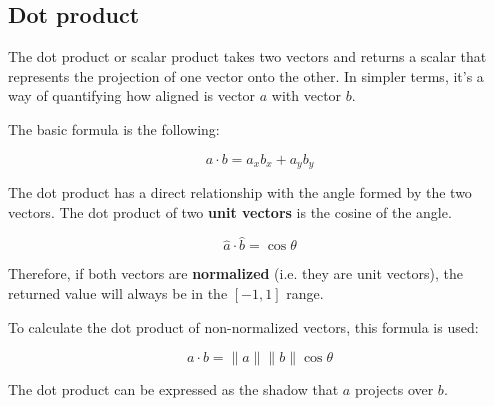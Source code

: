 \documentclass{amsart}
\begin{document}
\subsection{Dot product}

The dot product or scalar product takes two vectors and returns a scalar that
represents the projection of one vector onto the other. In simpler terms, it's a
way of quantifying how aligned is vector $a$ with vector $b$.

The basic formula is the following:

\begin{displaymath}
  a \cdot b = a_x b_x + a_y b_y
\end{displaymath}

The dot product has a direct relationship with the angle formed by the two
vectors. The dot product of two \textbf{unit vectors} is the cosine of the
angle.

\begin{displaymath}
  \hat{a} \cdot \hat{b} = \cos \theta
\end{displaymath}

Therefore, if both vectors are \textbf{normalized} (i.e. they are unit vectors),
the returned value will always be in the $[-1,1]$ range.

To calculate the dot product of non-normalized vectors, this formula is used:

\begin{displaymath}
  a \cdot b = \|a\| \|b\| \cos \theta
\end{displaymath}

The dot product can be expressed as the shadow that $a$ projects over $b$.
\end{document}
